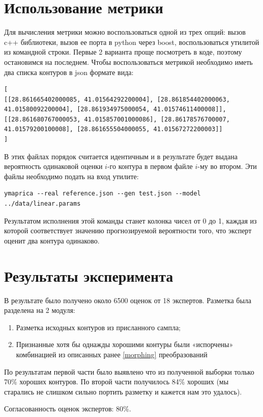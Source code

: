 \documentclass[12pt]{article}
\begin{document}
\section{Использование метрики}
\label{metrica-usage}
Для вычисления метрики можно воспользоваться одной из трех опций: вызов c++ библиотеки, вызов ее порта в python через boost, воспользоваться утилитой из командной строки. Первые 2 варианта проще посмотреть в коде, поэтому остановимся на последнем. Чтобы воспользоваться метрикой необходимо иметь два списка контуров в json формате вида:
{\tiny
\begin{verbatim}
[
[[28.861665402000085, 41.01564292200004], [28.861854402000063, 41.01580092200004], [28.861934975000054, 41.01574611400008]],
[[28.861680767000053, 41.015857001000086], [28.86178576700007, 41.01579200100008], [28.861655504000055, 41.01567272200003]]
]
\end{verbatim}
}
В этих файлах порядок считается идентичным и в результате будет выдана вероятность одинаковой оценки $i$-го контура в первом файле $i$-му во втором. Эти файлы необходимо подать на вход утилите:
{\footnotesize
\begin{verbatim}
ymaprica --real reference.json --gen test.json --model ../data/linear.params
\end{verbatim}}
Результатом исполнения этой команды станет колонка чисел от 0 до 1, каждая из которой соответствует значению прогнозируемой вероятности того, что эксперт оценит два контура одинаково.

\section{Результаты эксперимента}
\label{experiments}
В результате было получено около 6500 оценок от 18 экспертов.
Разметка была разделена на 2 модуля:
\begin{enumerate}
    \item Разметка исходных контуров из присланного сампла;
    \item Признанные хотя бы однажды хорошими контуры были «испорчены» комбинацией из описанных ранее \ref{morphing} преобразований
\end{enumerate}

По результатам первой части было выявлено что из полученной выборки только 70\% хороших контуров.
По второй части получилось 84\% хороших (мы старались не слишком сильно портить разметку и кажется нам это удалось).

Согласованность оценок экспертов: 80\%.
\end{document}
